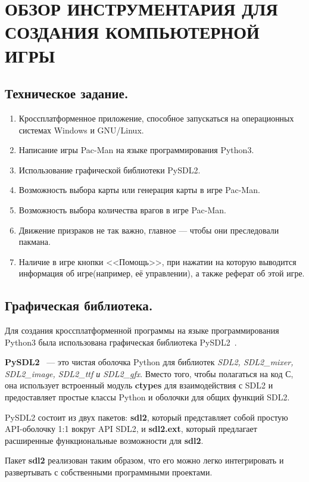 \chapter{\label{ch:ch01}ОБЗОР ИНСТРУМЕНТАРИЯ ДЛЯ СОЗДАНИЯ КОМПЬЮТЕРНОЙ ИГРЫ}

\section{\label{sec:ch01/sec01}Техническое задание.}
\begin{enumerate}
	\item Кроссплатформенное приложение, способное запускаться на операционных системах Windows и GNU/Linux.
	\item Написание игры Pac-Man на языке программирования Python3.
	\item Использование графической библиотеки PySDL2.
	\item Возможность выбора карты или генерация карты в игре Pac-Man.
	\item Возможность выбора количества врагов в игре Pac-Man.
	\item Движение призраков не так важно, главное --- чтобы они преследовали пакмана.
	\item Наличие в игре кнопки <<Помощь>>, при нажатии на которую выводится информация об игре(например, её управлении), а также реферат об этой игре.
\end{enumerate}

\section{\label{sec:ch01/sec02}Графическая библиотека.}
Для создания кроссплатформенной программы на языке программирования Python3 была использована графическая библиотека PySDL2~\cite{pypiRUENpysdl2,docENpysdl2}.

\textbf{PySDL2}~\label{pysdl2} --- это чистая оболочка Python для библиотек \textit{SDL2, SDL2\_mixer, SDL2\_image, SDL2\_ttf и SDL2\_gfx}. Вместо того, чтобы полагаться на код С, она использует
встроенный модуль \textbf{ctypes} для взаимодействия с SDL2 и предоставляет простые классы Python и оболочки для общих функций SDL2.

PySDL2 состоит из двух пакетов: \textbf{sdl2}, который представляет собой простую API-оболочку 1:1 вокруг API SDL2, и \textbf{sdl2.ext}, который предлагает расширенные функциональные возможности для \textbf{sdl2}.

Пакет \textbf{sdl2} реализован таким образом, что его можно легко интегрировать и развертывать с собственными программными проектами.

